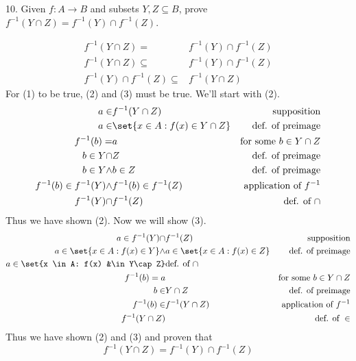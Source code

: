 \documentclass{hippoidC}
\begin{document}
\begin{prooflist}{10. Given $f: A \rightarrow B$ and subsets $Y, Z \subseteq B$,
    prove $f^{-1}(Y \cap Z)=f^{-1}(Y) \cap f^{-1}(Z)$.}
\item \imagedef{}
\setcounter{equation}{0}
\begin{align}
    f^{-1}(Y \cap Z)=&f^{-1}(Y) \cap f^{-1}(Z)\\
    f^{-1}(Y \cap Z)\subseteq &f^{-1}(Y) \cap f^{-1}(Z)\\
    f^{-1}(Y) \cap f^{-1}(Z) \subseteq & f^{-1}(Y \cap Z)
\end{align}
For (1) to be true, (2) and (3) must be true. We'll start with (2).
\begin{align}
    a\in& f^{-1}(Y\cap Z) &\text{supposition}\\
    a\in& \set{x \in A: f(x) \in Y\cap Z} &\text{def. of preimage}\\
    f^{-1}(b) =& a & \text{for some }b\in Y\cap Z\\
    b \in Y \cap& Z &\text{def. of preimage}\\
    b \in Y \land & b \in Z &\text{def. of preimage}\\
    f^{-1}(b) \in f^{-1}(Y) \land& f^{-1}(b) \in f^{-1}(Z)&\text{application of }f^{-1}\\
    f^{-1}(Y) \cap & f^{-1}(Z)&\text{def. of }\cap
\end{align}
Thus we have shown (2). Now we will show (3).
\begin{align}
    a\in f^{-1}(Y) \cap& f^{-1}(Z) &\text{supposition}\\
    a\in \set{x \in A: f(x) \in Y} \land& a\in \set{x \in A: f(x) \in Z} &\text{def. of preimage}\\
    a\in \set{x \in A: f(x) &\in Y\cap Z} &\text{def. of }\cap\\
    f^{-1}(b) = a& &\text{for some }b\in Y\cap Z\\
    b \in& Y \cap Z &\text{def. of preimage}\\
    f^{-1}(b) \in& f^{-1}(Y\cap Z)&\text{application of }f^{-1}\\
    f^{-1}(Y\cap Z)&&\text{def. of }\in
\end{align}
Thus we have shown (2) and (3) and proven that
\[
    f^{-1}(Y \cap Z)=f^{-1}(Y) \cap f^{-1}(Z)
\]
\end{prooflist}
\end{document}
